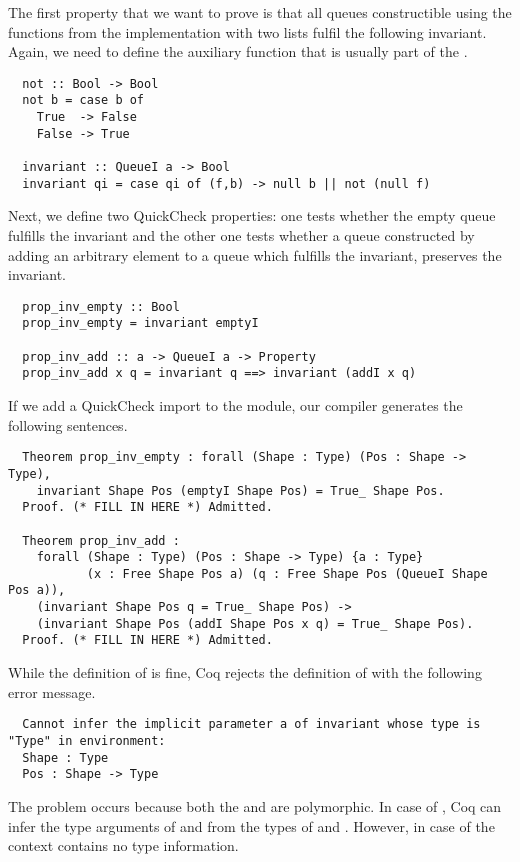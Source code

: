 The first property that we want to prove is that all queues constructible using the functions from the implementation with two lists fulfil the following invariant.
Again, we need to define the auxiliary function  that is usually part of the .
\begin{verbatim}
  not :: Bool -> Bool
  not b = case b of
    True  -> False
    False -> True

  invariant :: QueueI a -> Bool
  invariant qi = case qi of (f,b) -> null b || not (null f)
\end{verbatim}
Next, we define two QuickCheck properties: one tests whether the empty queue fulfills the invariant and the other one tests whether a queue constructed by adding an arbitrary element to a queue which fulfills the invariant, preserves the invariant.
\begin{verbatim}
  prop_inv_empty :: Bool
  prop_inv_empty = invariant emptyI

  prop_inv_add :: a -> QueueI a -> Property
  prop_inv_add x q = invariant q ==> invariant (addI x q)
\end{verbatim}
If we add a QuickCheck import to the module, our compiler generates the following  sentences.
\begin{verbatim}
  Theorem prop_inv_empty : forall (Shape : Type) (Pos : Shape -> Type),
    invariant Shape Pos (emptyI Shape Pos) = True_ Shape Pos.
  Proof. (* FILL IN HERE *) Admitted.

  Theorem prop_inv_add :
    forall (Shape : Type) (Pos : Shape -> Type) {a : Type}
           (x : Free Shape Pos a) (q : Free Shape Pos (QueueI Shape Pos a)),
    (invariant Shape Pos q = True_ Shape Pos) ->
    (invariant Shape Pos (addI Shape Pos x q) = True_ Shape Pos).
  Proof. (* FILL IN HERE *) Admitted.
\end{verbatim}
While the definition of  is fine, Coq rejects the definition of  with the following error message.
\begin{verbatim}
  Cannot infer the implicit parameter a of invariant whose type is "Type" in environment:
  Shape : Type
  Pos : Shape -> Type
\end{verbatim}
The problem occurs because both the  and  are polymorphic.
In case of , Coq can infer the type arguments of  and  from the types of  and .
However, in case of  the context contains no type information.
